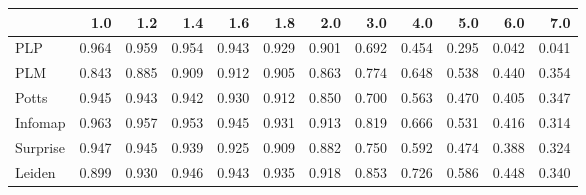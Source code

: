 \begin{tabular}{lrrrrrrrrrrr}
\toprule
{} &   1.0 &   1.2 &   1.4 &   1.6 &   1.8 &   2.0 &   3.0 &   4.0 &   5.0 &   6.0 &   7.0 \\
\midrule
PLP      & 0.964 & 0.959 & 0.954 & 0.943 & 0.929 & 0.901 & 0.692 & 0.454 & 0.295 & 0.042 & 0.041 \\
PLM      & 0.843 & 0.885 & 0.909 & 0.912 & 0.905 & 0.863 & 0.774 & 0.648 & 0.538 & 0.440 & 0.354 \\
Potts    & 0.945 & 0.943 & 0.942 & 0.930 & 0.912 & 0.850 & 0.700 & 0.563 & 0.470 & 0.405 & 0.347 \\
Infomap  & 0.963 & 0.957 & 0.953 & 0.945 & 0.931 & 0.913 & 0.819 & 0.666 & 0.531 & 0.416 & 0.314 \\
Surprise & 0.947 & 0.945 & 0.939 & 0.925 & 0.909 & 0.882 & 0.750 & 0.592 & 0.474 & 0.388 & 0.324 \\
Leiden   & 0.899 & 0.930 & 0.946 & 0.943 & 0.935 & 0.918 & 0.853 & 0.726 & 0.586 & 0.448 & 0.340 \\
\bottomrule
\end{tabular}

